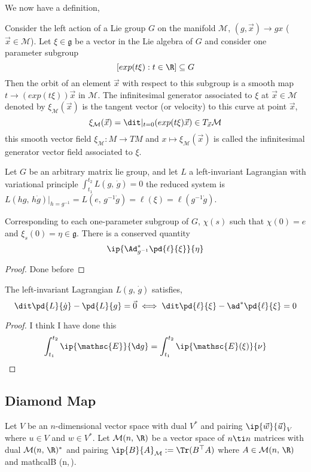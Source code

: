 We now have a definition,
\begin{ndefi}
  Consider the left action of a Lie group $G$ on the manifold $\mathcal{M}$, $(g, \vec x) \to gx$ ($\vec x \in \mathcal{M}$). Let $\xi \in \mathfrak{g}$ be a vector in the Lie algebra of $G$ and consider one parameter subgroup $$[exp(t\xi) : t \in \R] \subseteq G$$
  Then the orbit of an element $\vec x$ with respect to this subgroup is a smooth map $t \to (exp(t\xi))\vec x$ in $\mathcal{M}$. The infinitesimal generator associated to $\xi$ at $\vec x \in \mathcal{M}$ denoted by $\xi_{\mathcal{M}}(\vec x)$ is the tangent vector (or velocity) to this curve at point $\vec x$,
  $$ \xi_{\mathcal{M}} (\vec x) = \dit|_{t=0} (exp(t \xi)\vec x) \in T_{\vec x}\mathcal{M} $$
  this smooth vector field $\xi_{\mathcal{M}} : M \to TM$ and $x \mapsto \xi_{\mathcal{M}}(\vec x)$ is called the infinitesimal generator vector field associated to $\xi$.
\end{ndefi}

Let $G$ be an arbitrary matrix lie group, and let $L$ a left-invariant Lagrangian with variational principle $\int_{t_1}^{t_2} L(g,\,\dot g) = 0$ the reduced system is $L(hg,\, h\dot g)|_{h = g^{-1}} = L(e,\,g^{-1}\dot g) = \ell(\xi) = \ell(g^{-1}\dot g)$.
\begin{nthm}
  Corresponding to each one-parameter subgroup of $G$, $\chi(s)$ such that $\chi(0) = e$ and $\xi_s(0) = \eta \in \mathfrak{g}$. There is a conserved quantity
  $$ \ip{\Ad^*_{g^{-1}} \pd{\ell}{\xi}}{\eta} $$
\end{nthm}
\begin{proof}
  Done before
\end{proof}

\begin{nprop}
  The left-invariant Lagrangian $L(g,\,\dot g)$ satisfies,
  $$ \dit\pd{L}{\dot g} - \pd{L}{g} = \vec 0  \iff \dit\pd{\ell}{\xi} - \ad^*\pd{\ell}{\xi} = 0$$
\end{nprop}
\begin{proof}
  I think I have done this
  $$ \int_{t_1}^{t_2} \ip{\mathsc{E}}{\d g} = \int_{t_1}^{t_2} \ip{\mathsc{E}(\xi)}{\nu} $$
\end{proof}

\subsection{Diamond Map}
Let $V$ be an $n$-dimensional vector space with dual $V^*$ and pairing $\ip{\vec w}{\vec u}_V$ where $u \in V$ and $w \in V^*$. Let $\mathcal{M}(n,\,\R)$ be a vector space of $n \ti n$ matrices with dual $\mathcal{M}(n,\,\R)^*$ and pairing $\ip{B}{A}_{\mathcal{M}} := \Tr(B^\top A)$ where $A \in \mathcal{M}(n,\,\R)$ and mathcal{B \in {}(n,\,\R)}.

